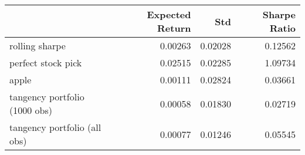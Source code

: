\begin{tabular}{lrrr}
\toprule
{} &  Expected Return &      Std &  Sharpe Ratio \\
\midrule
rolling sharpe                &          0.00263 &  0.02028 &       0.12562 \\
perfect stock pick            &          0.02515 &  0.02285 &       1.09734 \\
apple                         &          0.00111 &  0.02824 &       0.03661 \\
tangency portfolio (1000 obs) &          0.00058 &  0.01830 &       0.02719 \\
tangency portfolio (all obs)  &          0.00077 &  0.01246 &       0.05545 \\
\bottomrule
\end{tabular}
